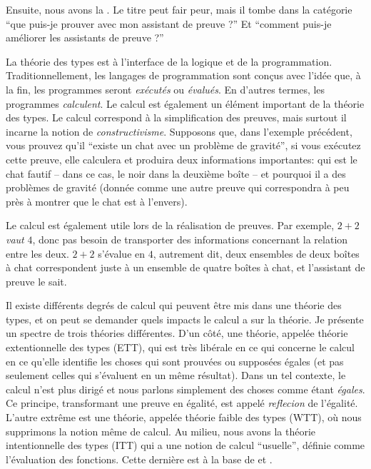Ensuite, nous avons la .
Le titre peut fair peur, mais il tombe dans la catégorie ``que puis-je prouver
avec mon assistant de preuve ?'' Et ``comment puis-je améliorer les assistants
de preuve ?''

La théorie des types est à l'interface de la logique et de la programmation.
Traditionnellement, les langages de programmation sont conçus avec l'idée que,
à la fin, les programmes seront \emph{exécutés} ou \emph{évalués}. En d'autres
termes, les programmes \emph{calculent}.
Le calcul est également un élément important de la théorie des types. Le calcul
correspond à la simplification des preuves, mais surtout il incarne la notion de
\emph{constructivisme}. Supposons que, dans l'exemple précédent, vous prouvez
qu'il ``existe un chat avec un problème de gravité'', si vous exécutez cette
preuve, elle calculera et produira deux informations importantes: qui est le
chat fautif -- dans ce cas, le noir dans la deuxième boîte -- et pourquoi il a
des problèmes de gravité (donnée comme une autre preuve qui correspondra à peu
près à montrer que le chat est à l'envers).

Le calcul est également utile lors de la réalisation de preuves.
Par exemple, \(2 + 2\) \emph{vaut} \(4\), donc pas besoin de transporter des
informations concernant la relation entre les deux. \(2 + 2\) s'évalue en \(4\),
autrement dit, deux ensembles de deux boîtes à chat correspondent juste à un
ensemble de quatre boîtes à chat, et l'assistant de preuve le sait.

Il existe différents degrés de calcul qui peuvent être mis dans une théorie des
types, et on peut se demander quels impacts le calcul a sur la théorie.
Je présente un spectre de trois théories différentes.
D'un côté, une théorie, appelée théorie extentionnelle des types (ETT), qui est
très libérale en ce qui concerne le calcul en ce qu'elle identifie les choses
qui sont prouvées ou supposées égales (et pas seulement celles qui s'évaluent
en un même résultat).
%
Dans un tel contexte, le calcul n'est plus dirigé et nous parlons simplement des
choses comme étant \emph{égales}.
%
Ce principe, transformant une preuve en égalité, est appelé \emph{reflecion} de
l'égalité.
L'autre extrême est une théorie, appelée théorie faible des types (WTT), où nous
supprimons la notion même de calcul. Au milieu, nous avons la théorie
intentionnelle des types (ITT) qui a une notion de calcul ``usuelle'', définie
comme l'évaluation des fonctions. Cette dernière est à la base de \Coq et \Agda.

